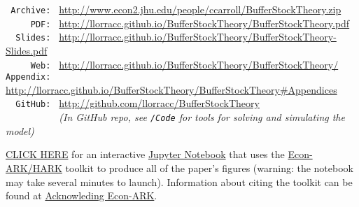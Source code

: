 \documentclass[./BufferStockTheory.tex]{subfiles}
\begin{document}
\hypertarget{links}{}
\begin{small}
\parbox{\textwidth}{
\begin{center}
\begin{tabbing}
\texttt{~Archive:~} \= \= \url{http://www.econ2.jhu.edu/people/ccarroll/BufferStockTheory.zip} \kill \\  %
\texttt{~~~~~PDF:~} \> \> \url{http://llorracc.github.io/BufferStockTheory/BufferStockTheory.pdf} \\
\texttt{~~Slides:~} \> \> \url{http://llorracc.github.io/BufferStockTheory/BufferStockTheory-Slides.pdf} \\
\texttt{~~~~~Web:~} \> \> \url{http://llorracc.github.io/BufferStockTheory/BufferStockTheory/}    \\
\texttt{Appendix:~} \> \> \url{http://llorracc.github.io/BufferStockTheory/BufferStockTheory\#Appendices}    \\
\texttt{~~GitHub:~} \> \> \url{http://github.com/llorracc/BufferStockTheory} \\
\texttt{~~~~~~~~~~} \> \> \textit{(In GitHub repo, see \texttt{/Code} for tools for solving and simulating the model)} \\
\end{tabbing}
\end{center}
          
\href{https://econ-ark.org/materials/BufferStockTheory}{CLICK HERE} for an interactive \href{https://en.wikipedia.org/wiki/Project\_Jupyter\#Jupyter_Notebook}{Jupyter Notebook} that uses the \href{https://econ-ark/HARK}{Econ-ARK/HARK} toolkit to produce all of the paper's figures (warning: the notebook may take several minutes to launch).  Information about citing the toolkit can be found at \href{https://econ-ark.org/acknowledging/}{Acknowleding Econ-ARK}.
} %
\end{small}

\begin{authorsinfo}
\end{authorsinfo}
\end{document}
